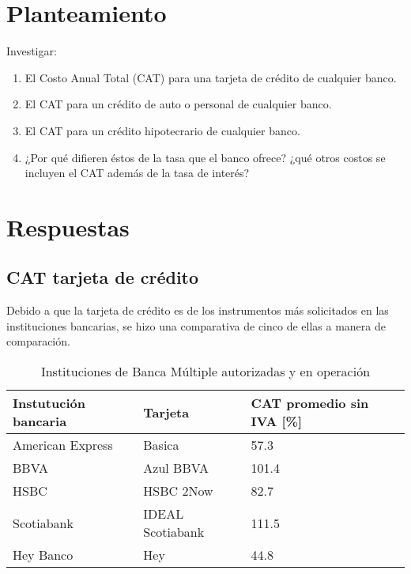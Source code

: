 \documentclass[12pt]{article}
\begin{document}
    
    \section{Planteamiento}
        Investigar:
        \begin{enumerate}
            \item El Costo Anual Total (CAT) para una tarjeta de crédito de cualquier banco.
            \item El CAT para un crédito de auto o personal de cualquier banco.
            \item El CAT para un crédito hipotecrario de cualquier banco.
            \item ¿Por qué difieren éstos de la tasa que el banco ofrece? ¿qué otros costos se incluyen el CAT además de la tasa de interés?
        \end{enumerate}
    \section{Respuestas}
        \subsection{CAT tarjeta de crédito}
            Debido a que la tarjeta de crédito es de los instrumentos más solicitados en las instituciones bancarias, se hizo una comparativa de cinco de ellas a manera de comparación. 
             \begingroup
                \begin{table}[h!]
                    \centering
                    \caption {Instituciones de Banca Múltiple autorizadas y en operación} 
                    \begin{tabular}{lll}
                        \hline
                        Instutución bancaria & Tarjeta & CAT promedio sin IVA [\%] \\
                        \hline
                        American Express\footnotemark &  Basica  & 57.3
                        \\       
                        BBVA\footnotemark &  Azul BBVA   &   101.4
                        \\         
                        HSBC\footnotemark  &  HSBC 2Now  &   82.7
                        \\
                        Scotiabank\footnotemark & IDEAL Scotiabank & 111.5
                        \\
                        Hey Banco\footnotemark  & Hey    &   44.8
                        \\    
                    \end{tabular}
                    
                \end{table}
            \endgroup
\end{document}
